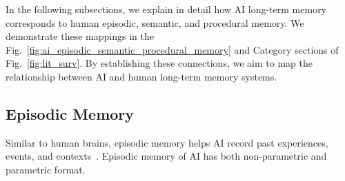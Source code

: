 \documentclass[journal,hideappendix]{vgtc}
\begin{document}
In the following subsections, we explain in detail how AI long-term memory corresponds to human episodic, semantic, and procedural memory. 
We demonstrate these mappings in the Fig.~\ref{fig:ai_episodic_semantic_procedural_memory} and Category sections of Fig.~\ref{fig:lit_surv}.
By establishing these connections, we aim to map the relationship between AI and human long-term memory systems.


\subsection{Episodic Memory}
\label{sec:hierarchy_ai_memory:episodic}

Similar to human brains, episodic memory helps AI record past experiences, events, and contexts~\cite{tulving1972episodic,andrew2007episodic}. Episodic memory of AI has both non-parametric and parametric format.
\end{document}
